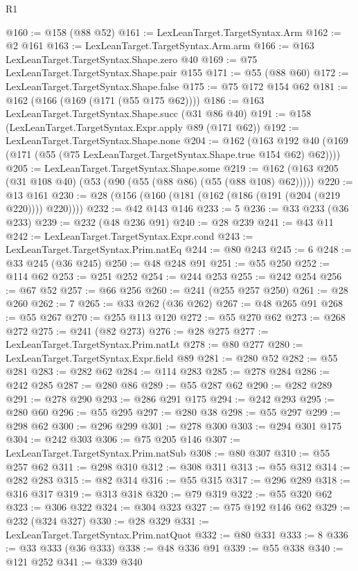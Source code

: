 \begin{lexlean}{R1}
\begin{coremodule}
@160 := @158 (@88 @52)
@161 := LexLeanTarget.TargetSyntax.Arm
@162 := @2 @161
@163 := LexLeanTarget.TargetSyntax.Arm.arm
@166 := @163 LexLeanTarget.TargetSyntax.Shape.zero @40
@169 := @75 LexLeanTarget.TargetSyntax.Shape.pair @155
@171 := @55 (@88 @60)
@172 := LexLeanTarget.TargetSyntax.Shape.false
@175 := @75 @172 @154 @62
@181 := @162 (@166 (@169 (@171 (@55 @175 @62))))
@186 := @163 LexLeanTarget.TargetSyntax.Shape.succ (@31 @86 @40)
@191 := @158 (LexLeanTarget.TargetSyntax.Expr.apply @89 (@171 @62))
@192 := LexLeanTarget.TargetSyntax.Shape.none
@204 := @162
    (@163 @192 @40 (@169 (@171 (@55 (@75 LexLeanTarget.TargetSyntax.Shape.true @154 @62) @62))))
@205 := LexLeanTarget.TargetSyntax.Shape.some
@219 := @162 (@163 @205 (@31 @108 @40) (@53 (@90 (@55 (@88 @86) (@55 (@88 @108) @62)))))
@220 := @13 @161
@230 := @28 (@156 (@160 (@181 (@162 (@186 (@191 (@204 (@219 @220)))) @220))))
@232 := @42 @143 @146
@233 := 5
@236 := @33 @233 (@36 @233)
@239 := @232 (@48 @236 @91)
@240 := @28 @239
@241 := @43 @11
@242 := LexLeanTarget.TargetSyntax.Expr.cond
@243 := LexLeanTarget.TargetSyntax.Prim.natEq
@244 := @80 @243
@245 := 6
@248 := @33 @245 (@36 @245)
@250 := @48 @248 @91
@251 := @55 @250
@252 := @114 @62
@253 := @251 @252
@254 := @244 @253
@255 := @242 @254
@256 := @67 @52
@257 := @66 @256
@260 := @241 (@255 @257 @250)
@261 := @28 @260
@262 := 7
@265 := @33 @262 (@36 @262)
@267 := @48 @265 @91
@268 := @55 @267
@270 := @255 @113 @120
@272 := @55 @270 @62
@273 := @268 @272
@275 := @241 (@82 @273)
@276 := @28 @275
@277 := LexLeanTarget.TargetSyntax.Prim.natLt
@278 := @80 @277
@280 := LexLeanTarget.TargetSyntax.Expr.field @89
@281 := @280 @52
@282 := @55 @281
@283 := @282 @62
@284 := @114 @283
@285 := @278 @284
@286 := @242 @285
@287 := @280 @86
@289 := @55 @287 @62
@290 := @282 @289
@291 := @278 @290
@293 := @286 @291 @175
@294 := @242 @293
@295 := @280 @60
@296 := @55 @295
@297 := @280 @38
@298 := @55 @297
@299 := @298 @62
@300 := @296 @299
@301 := @278 @300
@303 := @294 @301 @175
@304 := @242 @303
@306 := @75 @205 @146
@307 := LexLeanTarget.TargetSyntax.Prim.natSub
@308 := @80 @307
@310 := @55 @257 @62
@311 := @298 @310
@312 := @308 @311
@313 := @55 @312
@314 := @282 @283
@315 := @82 @314
@316 := @55 @315
@317 := @296 @289
@318 := @316 @317
@319 := @313 @318
@320 := @79 @319
@322 := @55 @320 @62
@323 := @306 @322
@324 := @304 @323
@327 := @75 @192 @146 @62
@329 := @232 (@324 @327)
@330 := @28 @329
@331 := LexLeanTarget.TargetSyntax.Prim.natQuot
@332 := @80 @331
@333 := 8
@336 := @33 @333 (@36 @333)
@338 := @48 @336 @91
@339 := @55 @338
@340 := @121 @252
@341 := @339 @340

\end{coremodule}
\end{lexlean}
